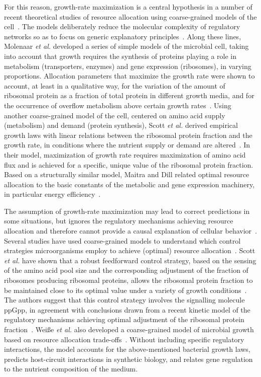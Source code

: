 For this reason, growth-rate maximization is a central hypothesis in a number of recent theoretical studies of resource allocation using coarse-grained models of the cell~\cite{molenaar_shifts_2009,scott_interdependence_2010,scott_emergence_2014}.
The models deliberately reduce the molecular complexity of regulatory networks so as to focus on generic explanatory principles~\cite{servedio_not_2014}.
Along these lines, Molenaar \textit{et al.} developed a series of simple models of the microbial cell, taking into account that growth requires the synthesis of proteins playing a role in metabolism (transporters, enzymes) and gene expression (ribosomes), in varying proportions.
Allocation parameters that maximize the growth rate were shown to account, at least in a qualitative way, for the variation of the amount of ribosomal protein as a fraction of total protein in different growth media, and for the occurrence of overflow metabolism above certain growth rates~\cite{molenaar_shifts_2009}.
Using another coarse-grained model of the cell, centered on amino acid supply (metabolism) and demand (protein synthesis), Scott \textit{et al.} derived empirical growth laws with linear relations between the ribosomal protein fraction and the growth rate, in conditions where the nutrient supply or demand are altered~\cite{scott_interdependence_2010,scott_emergence_2014}.
In their model, maximization of growth rate requires maximization of amino acid flux and is achieved for a specific, unique value of the ribosomal protein fraction.
Based on a structurally similar model, Maitra and Dill related optimal resource allocation to the basic constants of the metabolic and gene expression machinery, in particular energy efficiency~\cite{maitra_bacterial_2014}.

The assumption of growth-rate maximization may lead to correct predictions in some situations, but ignores the regulatory mechanisms achieving resource allocation and therefore cannot provide a causal explanation of cellular behavior~\cite{kremling_understanding_2015}.
Several studies have used coarse-grained models to understand which control strategies microorganisms employ to achieve (optimal) resource allocation~\cite{bosdriesz_how_2015,scott_emergence_2014,weisse_mechanistic_2015}.
Scott \textit{et al.} have shown that a robust feedforward control strategy, based on the sensing of the amino acid pool size and the corresponding adjustment of the fraction of ribosomes producing ribosomal proteins, allows the ribosomal protein fraction to be maintained close to its optimal value under a variety of growth conditions~\cite{scott_emergence_2014}.
The authors suggest that this control strategy involves the signalling molecule ppGpp, in agreement with conclusions drawn from a recent kinetic model of the regulatory mechanisms achieving optimal adjustment of the ribosomal protein fraction~\cite{bosdriesz_how_2015}.
Wei{\ss}e \textit{et al.} also developed a coarse-grained model of microbial growth based on resource allocation trade-offs~\cite{weisse_mechanistic_2015}. 
Without including specific regulatory interactions, the model accounts for the above-mentioned bacterial growth laws, predicts host-circuit interactions in synthetic biology, and relates gene regulation to the nutrient composition of the medium.

